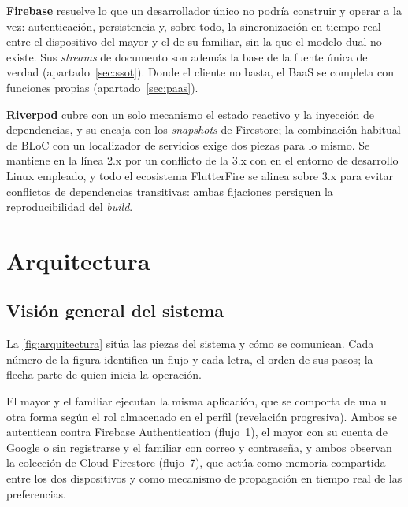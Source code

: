 \textbf{Firebase} resuelve lo que un desarrollador único no podría construir y operar a la vez: autenticación, persistencia y, sobre todo, la sincronización en tiempo real entre el dispositivo del mayor y el de su familiar, sin la que el modelo dual no existe. Sus \emph{streams} de documento son además la base de la fuente única de verdad (apartado~\ref{sec:ssot}). Donde el cliente no basta, el BaaS se completa con funciones propias (apartado~\ref{sec:paas}).

\textbf{Riverpod} cubre con un solo mecanismo el estado reactivo y la inyección de dependencias, y su  encaja con los \emph{snapshots} de Firestore; la combinación habitual de BLoC con un localizador de servicios exige dos piezas para lo mismo. Se mantiene en la línea 2.x por un conflicto de la 3.x con  en el entorno de desarrollo Linux empleado, y todo el ecosistema FlutterFire se alinea sobre  3.x para evitar conflictos de dependencias transitivas: ambas fijaciones persiguen la reproducibilidad del \emph{build}.

\section{Arquitectura}
\label{sec:arquitectura}

\subsection{Visión general del sistema}
\label{sec:arquitectura-general}

La \autoref{fig:arquitectura} sitúa las piezas del sistema y cómo se comunican. Cada número de la figura identifica un flujo y cada letra, el orden de sus pasos; la flecha parte de quien inicia la operación.

El mayor y el familiar ejecutan la misma aplicación, que se comporta de una u otra forma según el rol almacenado en el perfil (revelación progresiva). Ambos se autentican contra Firebase Authentication (flujo~1), el mayor con su cuenta de Google o sin registrarse y el familiar con correo y contraseña, y ambos observan la colección  de Cloud Firestore (flujo~7), que actúa como memoria compartida entre los dos dispositivos y como mecanismo de propagación en tiempo real de las preferencias.

